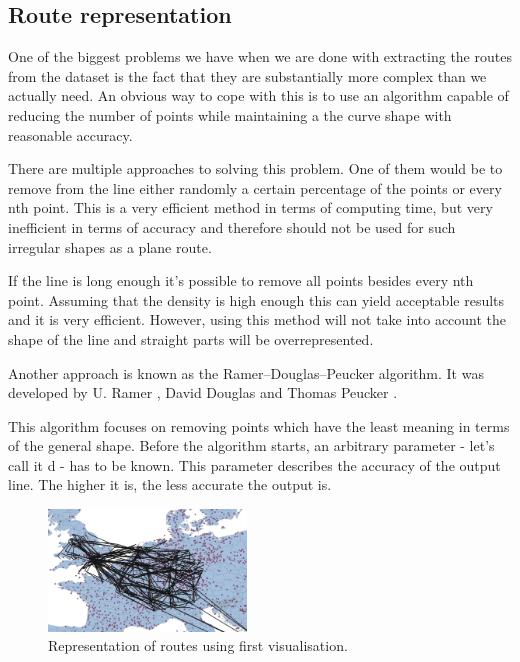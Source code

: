 \documentclass{vldb}
\begin{document}
\subsection{Route representation}
One of the biggest problems we have when we are done with extracting 
the routes from the dataset is the fact that they are substantially more 
complex than we actually need. An obvious way to cope with this is to use 
an algorithm capable of reducing the number of points while maintaining 
a the curve shape with reasonable accuracy.

There are multiple approaches to solving this problem.
 One of them would be to remove from the line either randomly a certain 
percentage of the points or every nth point. This is a very efficient method 
in terms of computing time, but very inefficient in terms of accuracy 
and therefore should not be used for such irregular shapes as a plane route.

If the line is long enough it’s possible to remove all points besides every nth point. 
Assuming that the density is high enough this can yield acceptable results and it is 
very efficient. However, using this method will not take into account 
the shape of the line and straight parts will be overrepresented.

Another approach is known as the Ramer–Douglas–Peucker algorithm. 
It was developed by U. Ramer \cite{Ramer:polygonal}, David Douglas and Thomas Peucker \cite{Douglas:reduction}.

This algorithm focuses on removing points which have the least meaning 
in terms of the general shape. Before the algorithm starts, an arbitrary
 parameter - let’s call it d - has to be known. This parameter describes the 
accuracy of the output line. The higher it is, the less accurate the output is.

\begin{figure}
\centering
\includegraphics[width=0.47\textwidth]{europe_airports_routes_sample}
\caption{Representation of routes using first visualisation.}
\label{fig:europe_airports_routes_samplei}
\end{figure}
\end{document}
